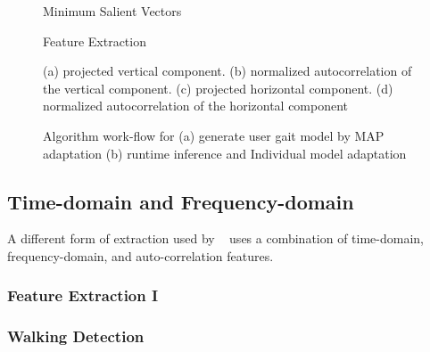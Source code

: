 \documentclass{sig-alternate}
\begin{document}
\begin{figure*}
\centering
{}
\caption{Minimum Salient Vectors}
\label{fig:AccelChart}
\end{figure*}

\begin{figure}
\centering
{}
\caption{Feature Extraction}
\label{fig:SecondStep}
\end{figure}

\begin{figure}
\centering
{}
\caption{(a) projected vertical component. (b) normalized autocorrelation of the vertical component. (c) projected horizontal component. (d) normalized autocorrelation of the horizontal component}
\label{fig:TD1}
\end{figure}

\begin{figure}
\centering
{}
\caption{Algorithm work-flow for (a) generate user gait model by MAP adaptation (b) runtime inference and Individual model adaptation}
\label{fig:TD2}
\end{figure}

\subsection{Time-domain and Frequency-domain}
	A different form of extraction used by ~\cite{Lu:2014} uses a combination of time-domain, frequency-domain, and auto-correlation features. 
\subsubsection{Feature Extraction I}

\subsubsection{Walking Detection}
\end{document}
